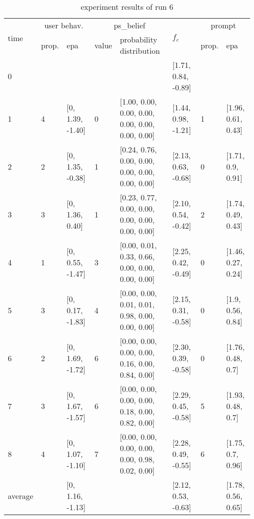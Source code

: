 \begin{table}[htbp]\footnotesize
\caption{experiment results of run 6}
\begin{center}
\begin{tabular}{|p{0.4cm}|p{0.6cm}|l|p{0.6cm}|p{3.3cm}|l|p{0.6cm}|l|}
\hline

\multirow{2}{*}{time} & \multicolumn{2}{c|}{user behav.} & \multicolumn{2}{c|}{ps\_belief} &
\multirow{2}{*}{$f_c$} & \multicolumn{2}{c|}{prompt} \\ \cline{2-5}\cline{ 7- 8}
& prop. & epa & value & probability distribution &  & prop. & epa \\ \hline

0 & \multicolumn{1}{l|}{} &  & \multicolumn{1}{l|}{} &  & [1.71, 0.84, -0.89] & \multicolumn{1}{l|}{} &  \\ \hline
1 & 4 & [0, 1.39, -1.40] & 0 & [1.00, 0.00, 0.00, 0.00, 0.00, 0.00, 0.00, 0.00] & [1.44, 0.98, -1.21] & 1 & [1.96, 0.61, 0.43] \\ \hline
2 & 2 & [0, 1.35, -0.38] & 1 & [0.24, 0.76, 0.00, 0.00, 0.00, 0.00, 0.00, 0.00] & [2.13, 0.63, -0.68] & 0 & [1.71, 0.9, 0.91] \\ \hline
3 & 3 & [0, 1.36, 0.40] & 1 & [0.23, 0.77, 0.00, 0.00, 0.00, 0.00, 0.00, 0.00] & [2.10, 0.54, -0.42] & 2 & [1.74, 0.49, 0.43] \\ \hline
4 & 1 & [0, 0.55, -1.47] & 3 & [0.00, 0.01, 0.33, 0.66, 0.00, 0.00, 0.00, 0.00] & [2.25, 0.42, -0.49] & 0 & [1.46, 0.27, 0.24] \\ \hline
5 & 3 & [0, 0.17, -1.83] & 4 & [0.00, 0.00, 0.01, 0.01, 0.98, 0.00, 0.00, 0.00] & [2.15, 0.31, -0.58] & 0 & [1.9, 0.56, 0.84] \\ \hline
6 & 2 & [0, 1.69, -1.72] & 6 & [0.00, 0.00, 0.00, 0.00, 0.16, 0.00, 0.84, 0.00] & [2.30, 0.39, -0.58] & 0 & [1.76, 0.48, 0.7] \\ \hline
7 & 3 & [0, 1.67, -1.57] & 6 & [0.00, 0.00, 0.00, 0.00, 0.18, 0.00, 0.82, 0.00] & [2.29, 0.45, -0.58] & 5 & [1.93, 0.48, 0.7] \\ \hline
8 & 4 & [0, 1.07, -1.10] & 7 & [0.00, 0.00, 0.00, 0.00, 0.00, 0.98, 0.02, 0.00] & [2.28, 0.49, -0.55] & 6 & [1.75, 0.7, 0.96] \\ \hline
\multicolumn{1}{|l|}{average} & \multicolumn{1}{l|}{} & [0, 1.16, -1.13] & \multicolumn{1}{l|}{} &  & [2.12, 0.53, -0.63] & \multicolumn{1}{l|}{} & [1.78, 0.56, 0.65] \\ \hline
\end{tabular}
\end{center}
\label{}
\end{table}


